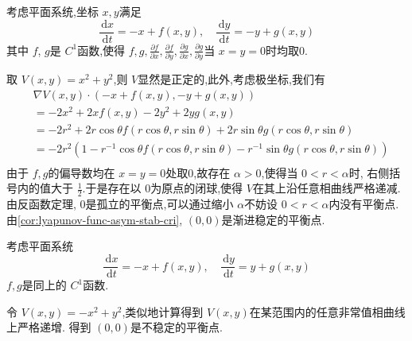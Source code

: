 \documentclass[lang=cn,12pt,color=green,fontset=none]{elegantbook}
\begin{document}
\begin{example}
    考虑平面系统,坐标 $ x,y $满足 $$
    \frac{\,\mathrm{d} x }{\,\mathrm{d} t } = -x+ f\left( x,y \right),\quad \frac{\,\mathrm{d} y }{\,\mathrm{d} t }=-y+  g\left( x,y \right)    
    $$其中 $ f $, $ g $是 $ C^{1} $函数,使得 $ f,g, \frac{\partial f}{\partial x},\frac{\partial f}{\partial y},\frac{\partial g}{\partial x},\frac{\partial g}{\partial y} $当 $ x=y=0 $时均取0.
      
\end{example}
\begin{solution}
    取 $ V\left( x,y \right)=x^{2}+ y^{2}  $,则 $ V $显然是正定的,此外,考虑极坐标,我们有 $$
    \begin{aligned}
  &   \nabla V\left( x,y \right)\cdot \left( -x+ f\left( x,y \right),-y+ g\left( x,y \right)   \right)   \\ 
     & = -2x^{2}+ 2xf\left( x,y \right)-2y^{2}+ 2yg\left( x,y \right)  \\ 
      & = -2r^{2} + 2r\cos \theta f\left( r\cos \theta ,r\sin \theta  \right)+ 2r\sin \theta g\left( r\cos \theta ,r\sin \theta  \right)\\ 
       & = -2r^{2}\left( 1-r^{-1} \cos \theta f\left( r\cos \theta ,r\sin \theta  \right)  -r^{-1} \sin \theta g\left( r\cos \theta ,r\sin \theta  \right) \right)   \\ 
    \end{aligned}
    $$  由于 $ f,g $的偏导数均在 $ x=y=0 $处取0,故存在 $ \alpha >0 $,使得当 $ 0<r<\alpha  $时, 右侧括号内的值大于 $ \frac{1}{2} $.于是存在以 $ 0 $为原点的闭球,使得 $ V $在其上沿任意相曲线严格递减.由反函数定理, $ 0 $是孤立的平衡点,可以通过缩小 $ \alpha  $不妨设 $ 0<r<\alpha  $内没有平衡点. 由\ref{cor:lyapunov-func-asym-stab-cri}, $ \left( 0,0 \right)  $是渐进稳定的平衡点. 
\end{solution}

\begin{example}
    考虑平面系统 $$
    \frac{\,\mathrm{d} x }{\,\mathrm{d} t }=-x+ f\left( x,y \right),\quad \frac{\,\mathrm{d} y }{\,\mathrm{d} t } = y+ g\left( x,y \right)    
    $$ $ f,g $是同上的 $ C^{1} $函数.  
\end{example}

\begin{solution}
    令 $ V\left( x,y \right)=-x^{2}+ y^{2}  $,类似地计算得到 $ V\left( x,y \right)  $在某范围内的任意非常值相曲线上严格递增. 得到 $ \left( 0,0 \right)  $是不稳定的平衡点. 
\end{solution}
\end{document}
